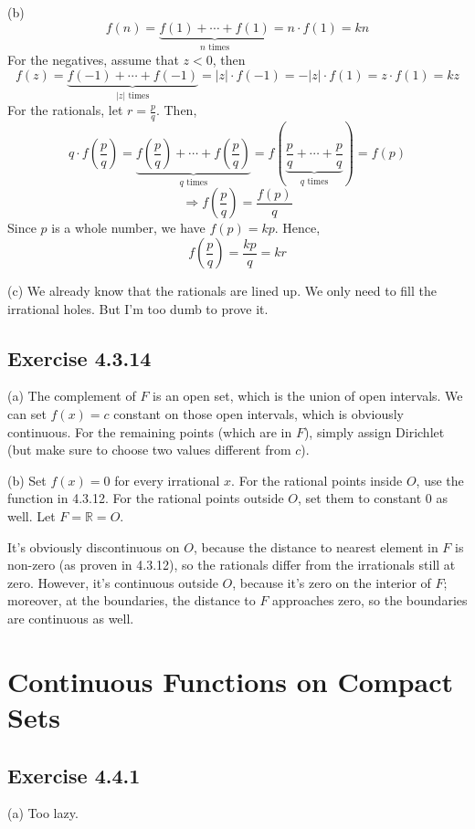 \documentclass{book}
\begin{document}
\noindent
(b)
$$f(n) = \underbrace{f(1) + \cdots + f(1)}_{n \text{ times}} = n \cdot f(1) = kn$$
For the negatives, assume that $z < 0$, then
$$f(z) = \underbrace{f(-1) + \cdots + f(-1)}_{|z| \text{ times}} = |z| \cdot f(-1) = -|z| \cdot f(1) = z \cdot f(1) = kz$$
For the rationals, let $r = \frac{p}{q}$. Then,
$$q \cdot f \left( \frac{p}{q} \right) = \underbrace{f \left( \frac{p}{q} \right) + \cdots + f \left( \frac{p}{q} \right)}_{q \text{ times}} = f \left( \underbrace{\frac{p}{q} + \cdots + \frac{p}{q}}_{q \text{ times}} \right) = f(p)$$
$$\Rightarrow f \left( \frac{p}{q} \right) = \frac{f(p)}{q}$$
Since $p$ is a whole number, we have $f(p) = kp$. Hence,
$$f \left( \frac{p}{q} \right) = \frac{kp}{q} = kr$$

\noindent
(c)
We already know that the rationals are lined up. We only need to fill the irrational holes. But I'm too dumb to prove it.

\subsection*{Exercise 4.3.14}
(a)
The complement of $F$ is an open set, which is the union of open intervals. We can set $f(x) = c$ constant on those open intervals, which is obviously continuous. For the remaining points (which are in $F$), simply assign Dirichlet (but make sure to choose two values different from $c$).

\noindent
(b)
Set $f(x) = 0$ for every irrational $x$. For the rational points inside $O$, use the function in 4.3.12. For the rational points outside $O$, set them to constant $0$ as well. Let $F = \mathbb{R} = O$.

It's obviously discontinuous on $O$, because the distance to nearest element in $F$ is non-zero (as proven in 4.3.12), so the rationals differ from the irrationals still at zero. However, it's continuous outside $O$, because it's zero on the interior of $F$; moreover, at the boundaries, the distance to $F$ approaches zero, so the boundaries are continuous as well.

\section{Continuous Functions on Compact Sets}

\subsection*{Exercise 4.4.1}
(a)
Too lazy.
\end{document}
